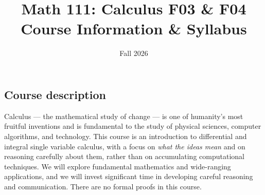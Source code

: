 \documentclass[11pt,twoside]{amsart}
\title[Math 111:  Calculus]{Math 111: Calculus F03 \& F04\\ Course Information \& Syllabus}
\author[Math 111:  Calculus]{Fall 2026}
\begin{document}
\maketitle

\thispagestyle{empty}

\vspace{-.5cm}

\begin{center}
\end{center}

\smallskip

\subsection*{Course description}
Calculus --- the mathematical study of change --- is one of humanity's most fruitful inventions and is fundamental to the study of physical sciences, computer algorithms, and technology. This course is an introduction to differential and integral single variable calculus, with a focus on \emph{what the ideas mean} and on reasoning carefully about them, rather than on accumulating computational techniques. We will explore fundamental mathematics and wide-ranging applications, and we will invest significant time in developing careful reasoning and communication. There are no formal proofs in this course.
\end{document}
